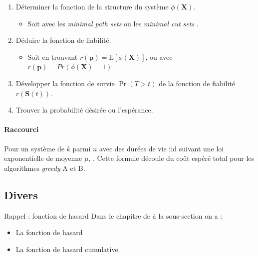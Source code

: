 \documentclass[10pt, french]{article}
\begin{document}
\begin{multicols*}{2}
\begin{definitionNOHFILLpropos}
\begin{enumerate}[label	=	\circled{\arabic*}{trueblue}]
	\item	Déterminer la fonction de la structure du système $\phi(\bm{X})$.
		\begin{itemize}
		\item	Soit avec les \og \textit{minimal path sets} \fg{} ou les \og \textit{minimal cut sets} \fg{}.
		\end{itemize}
	\item	Déduire la fonction de fiabilité.
		\begin{itemize}
		\item	Soit en trouvant $r(\bm{p}) = \text{E}[\phi(\bm{X})]$, ou avec $r(\bm{p}) = Pr(\phi(\bm{X}) = 1)$.
		\end{itemize}
	\item	Développer la fonction de survie $\Pr(T > t)$ de la fonction de fiabilité $r(\bm{S}(t))$.
	\item	Trouver la probabilité désirée ou l'espérance.
\end{enumerate}
\end{definitionNOHFILLpropos}

\paragraph{Raccourci}	Pour un système de $k$ parmi $n$ avec des durées de vie iid suivant une loi exponentielle de moyenne $\mu$, . Cette formule découle du coût espéré total pour les algorithmes \og \textit{greedy} \fg{} A et B.


\columnbreak
\subsection{Divers}
\label{subsec:reliabilityVaria}
\begin{rappel}{Rappel : fonction de hasard}
Dans le chapitre de \textit{\underline{}} à la sous-section \textit{\underline{}} on a : 
\begin{itemize}
	\item	La fonction de hasard 
	\item	La fonction de hasard cumulative 
\end{itemize}
\end{rappel}


\end{multicols*}
\end{document}
